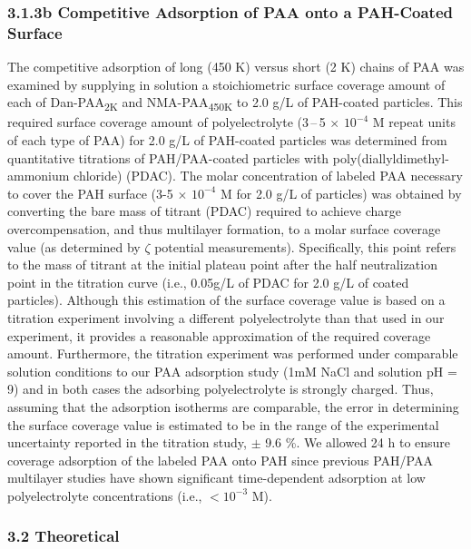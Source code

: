\documentclass[journal=mamobx,manuscript=article]{achemso}
\begin{document}
\subsubsection{3.1.3b Competitive Adsorption of PAA onto a PAH-Coated Surface}

The competitive adsorption of long (450 K) versus short (2 K) chains of PAA was examined by supplying in solution a stoichiometric surface coverage amount of each of Dan-PAA\textsubscript{2K} and NMA-PAA\textsubscript{450K} to 2.0 g/L of PAH-coated particles.  This required surface coverage amount of polyelectrolyte (3\,--\,5$\,\times \,10^{-4}$ M repeat units of each type of PAA) for 2.0 g/L of PAH-coated particles was determined from quantitative titrations of PAH/PAA-coated particles with poly(diallyldimethyl-ammonium chloride) (PDAC).\cite{Burke2003}   The molar concentration of labeled PAA necessary to cover the PAH surface (3-5 $\times$ $10^{-4}$ M for 2.0 g/L of particles) was obtained by converting the bare mass of titrant (PDAC) required to achieve charge overcompensation, and thus multilayer formation, to a molar surface coverage value (as determined by $\zeta$ potential measurements).\cite{Burke2003}   Specifically, this point refers to the mass of titrant at the initial plateau point after the half neutralization point in the titration curve (i.e., 0.05g/L of PDAC for 2.0 g/L of coated particles).  Although this estimation of the surface coverage value is based on a titration experiment involving a different polyelectrolyte than that used in our experiment, it provides a reasonable approximation of the required coverage amount.  Furthermore, the titration experiment was performed under comparable solution conditions to our PAA adsorption study (1mM NaCl and solution pH = 9) and in both cases the adsorbing polyelectrolyte is strongly charged.  Thus, assuming that the adsorption isotherms are comparable, the error in determining the surface coverage value is estimated to be in the range of the experimental uncertainty reported in the titration study, $\pm$ 9.6 \%.  We allowed 24 h to ensure coverage adsorption of the labeled PAA onto PAH since previous PAH/PAA multilayer studies have shown significant time-dependent adsorption at low polyelectrolyte concentrations (i.e., $<10^{-3}$ M).\cite{Mermut2003}

\subsubsection{3.2 Theoretical}
\end{document}
